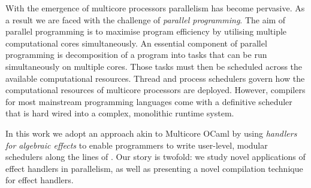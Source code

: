 \documentclass[mscres,cdtppar,twoside,openright,logo,rightchapter,normalheadings]{infthesis}
\theoremstyle{definition}
\begin{document}
%


%

With the emergence of multicore processors parallelism has become
pervasive. As a result we are faced with the challenge of
\emph{parallel programming}. The aim of parallel programming is to
maximise program efficiency by utilising multiple computational cores
simultaneously.
%
An essential component of parallel programming is decomposition of a
program into tasks that can be run simultaneously on multiple
cores. Those tasks must then be scheduled across the available
computational resources.  Thread and process schedulers govern how the
computational resources of multicore processors are deployed. However,
compilers for most mainstream programming languages come with a
definitive scheduler that is hard wired into a complex, monolithic
runtime system.



%


%

In this work we adopt an approach akin to Multicore OCaml
\citep{Dolan2014,Dolan2015} by using \emph{handlers for algebraic
  effects} \citep{Plotkin2001,Plotkin2003,Plotkin2013} to enable
programmers to write user-level, modular schedulers along the lines of
\citet{KC2016}. Our story is twofold: we study novel applications of
effect handlers in parallelism, as well as presenting a novel
compilation technique for effect handlers.
\end{document}
